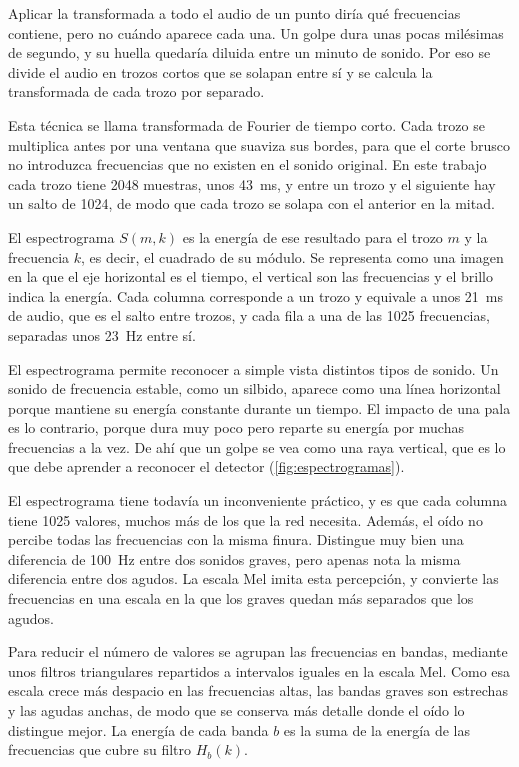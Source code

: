 Aplicar la transformada a todo el audio de un punto diría qué frecuencias contiene, pero no cuándo aparece cada una.
Un golpe dura unas pocas milésimas de segundo, y su huella quedaría diluida entre un minuto de sonido.
Por eso se divide el audio en trozos cortos que se solapan entre sí y se calcula la transformada de cada trozo por separado.

Esta técnica se llama transformada de Fourier de tiempo corto.
Cada trozo se multiplica antes por una ventana que suaviza sus bordes, para que el corte brusco no introduzca frecuencias que no existen en el sonido original.
En este trabajo cada trozo tiene 2048 muestras, unos 43~ms, y entre un trozo y el siguiente hay un salto de 1024, de modo que cada trozo se solapa con el anterior en la mitad.

El espectrograma $S(m, k)$ es la energía de ese resultado para el trozo $m$ y la frecuencia $k$, es decir, el cuadrado de su módulo.
Se representa como una imagen en la que el eje horizontal es el tiempo, el vertical son las frecuencias y el brillo indica la energía.
Cada columna corresponde a un trozo y equivale a unos 21~ms de audio, que es el salto entre trozos, y cada fila a una de las 1025 frecuencias, separadas unos 23~Hz entre sí.

El espectrograma permite reconocer a simple vista distintos tipos de sonido.
Un sonido de frecuencia estable, como un silbido, aparece como una línea horizontal porque mantiene su energía constante durante un tiempo.
El impacto de una pala es lo contrario, porque dura muy poco pero reparte su energía por muchas frecuencias a la vez.
De ahí que un golpe se vea como una raya vertical, que es lo que debe aprender a reconocer el detector (\cref{fig:espectrogramas}).

El espectrograma tiene todavía un inconveniente práctico, y es que cada columna tiene 1025 valores, muchos más de los que la red necesita.
Además, el oído no percibe todas las frecuencias con la misma finura.
Distingue muy bien una diferencia de 100~Hz entre dos sonidos graves, pero apenas nota la misma diferencia entre dos agudos.
La escala Mel imita esta percepción, y convierte las frecuencias en una escala en la que los graves quedan más separados que los agudos.

Para reducir el número de valores se agrupan las frecuencias en bandas, mediante unos filtros triangulares repartidos a intervalos iguales en la escala Mel.
Como esa escala crece más despacio en las frecuencias altas, las bandas graves son estrechas y las agudas anchas, de modo que se conserva más detalle donde el oído lo distingue mejor.
La energía de cada banda $b$ es la suma de la energía de las frecuencias que cubre su filtro $H_b(k)$.

